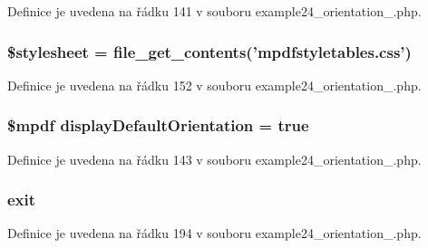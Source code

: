 Definice je uvedena na řádku 141 v souboru example24\-\_\-orientation\-\_.\-php.

\hypertarget{example24__orientation__2_8php_a19e5cf73e817c55a49205e6ec78c88a8}{
\subsubsection[{\$stylesheet}]{\setlength{\rightskip}{0pt plus 5cm}\$stylesheet = file\-\_\-get\-\_\-contents('mpdfstyletables.\-css')}}\label{example24__orientation__2_8php_a19e5cf73e817c55a49205e6ec78c88a8}


Definice je uvedena na řádku 152 v souboru example24\-\_\-orientation\-\_.\-php.

\hypertarget{example24__orientation__2_8php_a1d59a8b3178b7cb523a24506c7acc09f}{
\subsubsection[{display\-Default\-Orientation}]{\setlength{\rightskip}{0pt plus 5cm}\$mpdf display\-Default\-Orientation = true}}\label{example24__orientation__2_8php_a1d59a8b3178b7cb523a24506c7acc09f}


Definice je uvedena na řádku 143 v souboru example24\-\_\-orientation\-\_.\-php.

\hypertarget{example24__orientation__2_8php_a6733eb5f605d09eaede9845835d71c4e}{
\subsubsection[{exit}]{\setlength{\rightskip}{0pt plus 5cm}exit}}\label{example24__orientation__2_8php_a6733eb5f605d09eaede9845835d71c4e}


Definice je uvedena na řádku 194 v souboru example24\-\_\-orientation\-\_.\-php.

